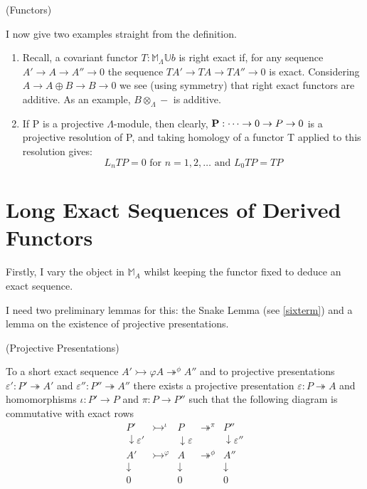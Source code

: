 \begin{example}(Functors\label{df1.4.1})

I now give two examples straight from the definition.

\begin{enumerate}
    \item Recall, a covariant functor $T:\mathbb M_\Lambda \mathbb
    U b$ is right exact if, for any sequence $A'\rightarrow
    A\rightarrow A''\rightarrow 0$ the sequence $TA'\rightarrow
    TA\rightarrow TA''\rightarrow 0$ is exact. Considering
    $A\rightarrow A\oplus B\rightarrow B\rightarrow 0$ we see (using symmetry) that
    right exact functors are additive. As an example,
    $B\otimes_\Lambda -$ is additive.
    \item If P is a projective $\Lambda$-module, then clearly,
    $\textbf P: \dots \rightarrow 0\rightarrow P\rightarrow 0 $ is
    a projective resolution of P, and taking homology of a functor
    T applied to this resolution gives: $$L_nTP = 0 \text{ for
    }n=1,2,\dots \text{ and }L_0TP = TP$$
\end{enumerate}
\end{example}

\section{Long Exact Sequences of Derived Functors}\label{df1.5}


Firstly, I vary the object in $\mathbb M_A$ whilst keeping the functor fixed to deduce an exact sequence. 

I need two preliminary lemmas for this: the Snake Lemma (see \ref{sixterm}) and a lemma on the existence of
projective presentations.



\begin{lemma}(Projective Presentations\label{df1.5.2})

To a short exact sequence $ A'\rightarrowtail\varphi
A\twoheadrightarrow^\phi A''$ and to projective presentations
$\varepsilon':P'\twoheadrightarrow A'$ and
$\varepsilon'':P''\twoheadrightarrow A''$ there exists a
projective presentation $\varepsilon:P\twoheadrightarrow A$ and
homomorphisms $\iota:P'\rightarrow P$ and $\pi:P\rightarrow P''$
such that the following diagram is commutative with exact rows
$$\begin{array}{ccccc}
  P' & \rightarrowtail^{\iota} & P & \twoheadrightarrow^{\pi} & P'' \\
  \downarrow \varepsilon' &  & \downarrow \varepsilon &  & \downarrow \varepsilon'' \\
  A' & \rightarrowtail^\varphi & A & \twoheadrightarrow^\phi & A'' \\
  \downarrow &                 &\downarrow &
  &\downarrow\\
  0 & & 0 & & 0
\end{array}$$
\end{lemma}

